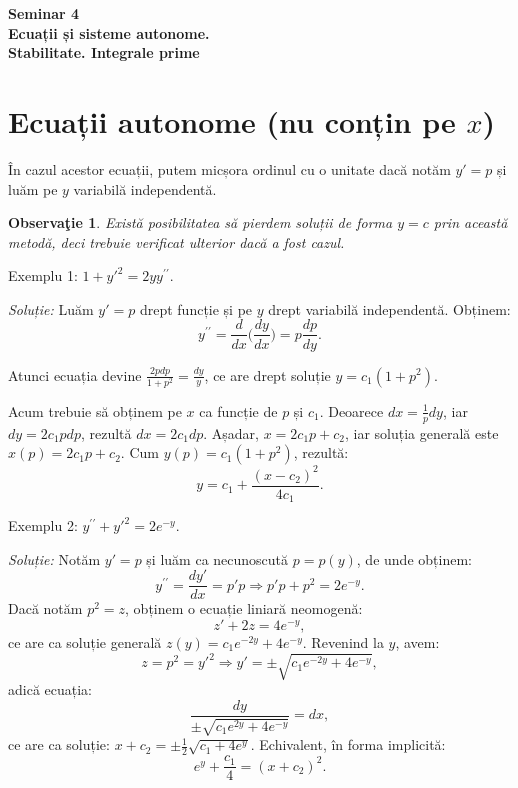 \documentclass[11pt,a4paper]{article}
\theoremstyle{dotless}
\theoremstyle{dotlessdr}
\newtheorem{remark}{Observa\c{t}ie}[section]
\begin{document}

\begin{center}
  {\large\textbf{Seminar 4 \\
      Ecuații și sisteme autonome. \\
      Stabilitate. Integrale prime}}
\end{center}

\vspace{2cm}

\section{Ecuații autonome (nu conțin pe $x$)}

În cazul acestor ecuații, putem micșora ordinul cu o unitate dacă notăm $y' = p$
și luăm pe $y$ variabilă independentă.

\begin{remark}\label{rk:autonom-pierd}
  Există posibilitatea să pierdem soluții de forma $y = c$ prin această metodă,
  deci trebuie verificat ulterior dacă a fost cazul.
\end{remark}

Exemplu 1: $1 + {y'}^2 = 2yy^{\prime\prime}$.

\emph{Soluție:} Luăm $y' = p$ drept funcție și pe $y$ drept variabilă independentă.
Obținem:
\[
  y^{\prime\prime} = \frac{d}{dx} \big( \frac{dy}{dx} \big) = p \frac{dp}{dy}.
\]

Atunci ecuația devine $\frac{2pdp}{1 + p^2} = \frac{dy}{y}$, ce are drept soluție
$y = c_1(1 + p^2)$.

Acum trebuie să obținem pe $x$ ca funcție de $p$ și $c_1$. Deoarece $dx = \frac{1}{p}dy$,
iar $dy = 2c_1 pdp$, rezultă $dx = 2c_1 dp$. Așadar, $x = 2c_1 p + c_2$, iar soluția
generală este $x(p) = 2c_1 p + c_2$. Cum $y(p) = c_1(1 + p^2)$, rezultă:
\[
  y = c_1 + \frac{(x - c_2)^2}{4c_1}.
\]

\vspace{1cm}

Exemplu 2: $y^{\prime\prime} + {y'}^2 = 2e^{-y}$.

\emph{Soluție:} Notăm $y' = p$ și luăm ca necunoscută $p = p(y)$,
de unde obținem:
\[
  y^{\prime\prime} = \frac{dy'}{dx} = p'p \Rightarrow p'p + p^2 = 2e^{-y}.
\]
Dacă notăm $p^2 = z$, obținem o ecuație liniară neomogenă:
\[
  z' + 2z = 4e^{-y},
\]
ce are ca soluție generală $z(y) = c_1 e^{-2y} + 4e^{-y}$. Revenind la $y$,
avem:
\[
  z = p^2 = {y'}^2 \Rightarrow y' = \pm \sqrt{c_1 e^{-2y} + 4e^{-y}},
\]
adică ecuația:
\[
  \frac{dy}{\pm\sqrt{c_1 e^{2y} + 4e^{-y}}} = dx,
\]
ce are ca soluție: $x + c_2 = \pm \frac{1}{2} \sqrt{c_1 + 4e^y}$. Echivalent, în forma
implicită:
\[
  e^y + \frac{c_1}{4} = (x + c_2)^2.
\]
\end{document}
